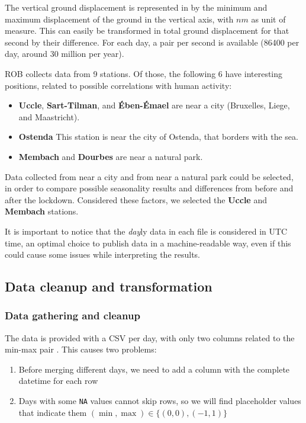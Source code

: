 \documentclass[12pt]{article}
\begin{document}
The vertical ground displacement is represented in by the minimum and maximum displacement of the ground in the vertical axis, with $nm$ as unit of measure. This can easily be transformed in total ground displacement for that second by their difference.
For each day, a pair per second is available (86400 per day, around 30 million per year).

ROB collects data from 9 stations. Of those, the following 6 have interesting positions, related to possible correlations with human activity:
\begin{itemize}
	\item \textbf{Uccle}, \textbf{Sart-Tilman}, and \textbf{Ében-Émael} are near a city (Bruxelles, Liege, and Maastricht).
	\item \textbf{Ostenda} This station is near the city of Ostenda, that borders with the sea.
	\item \textbf{Membach} and \textbf{Dourbes} are near a natural park.
\end{itemize}

Data collected from near a city and from near a natural park could be selected, in order to compare possible seasonality results and differences from before and after the lockdown. %
Considered these factors, we selected the \textbf{Uccle} and \textbf{Membach} stations.

It is important to notice that the \textit{day}ly data in each file is considered in UTC time, an optimal choice to publish data in a machine-readable way, even if this could cause some issues while interpreting the results.

\subsection{Data cleanup and transformation}\label{sec:cleanup-transform}
\subsubsection{Data gathering and cleanup}
The data is provided with a CSV per day, with only two columns related to the min-max pair \cite{Data20200402}. This causes two problems:
\begin{enumerate}
	\item Before merging different days, we need to add a column with the complete datetime for each row
	\item Days with some \texttt{NA} values cannot skip rows, so we will find placeholder values that indicate them $(\min, \max) \in \{(0,0), (-1,1)\}$
\end{enumerate}
\end{document}
